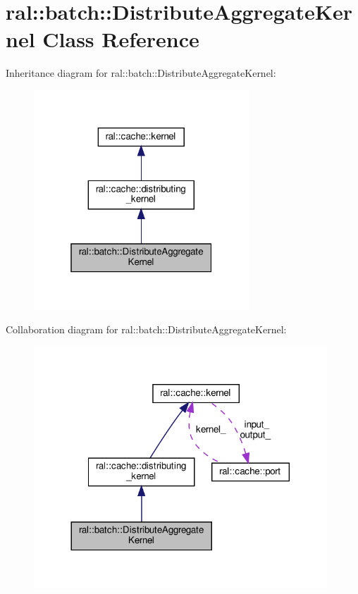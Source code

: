 \hypertarget{classral_1_1batch_1_1DistributeAggregateKernel}{}\section{ral\+:\+:batch\+:\+:Distribute\+Aggregate\+Kernel Class Reference}
\label{classral_1_1batch_1_1DistributeAggregateKernel}


Inheritance diagram for ral\+:\+:batch\+:\+:Distribute\+Aggregate\+Kernel\+:\nopagebreak
\begin{figure}[H]
\begin{center}
\leavevmode
\includegraphics[width=229pt]{classral_1_1batch_1_1DistributeAggregateKernel__inherit__graph}
\end{center}
\end{figure}


Collaboration diagram for ral\+:\+:batch\+:\+:Distribute\+Aggregate\+Kernel\+:\nopagebreak
\begin{figure}[H]
\begin{center}
\leavevmode
\includegraphics[width=312pt]{classral_1_1batch_1_1DistributeAggregateKernel__coll__graph}
\end{center}
\end{figure}
